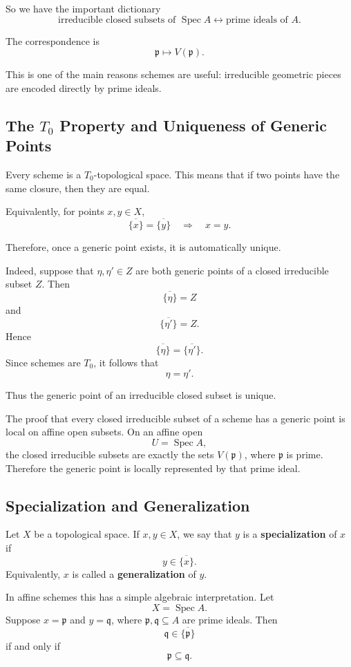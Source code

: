 \documentclass[12pt,a4paper]{article}
\DeclareMathOperator{\Spec}{Spec}
\providecommand{\Spec}{\operatorname{Spec}}
\theoremstyle{notespace}
\begin{document}
So we have the important dictionary
\[
\boxed{
	\text{irreducible closed subsets of } \Spec A
	\longleftrightarrow
	\text{prime ideals of } A.
}
\]

The correspondence is
\[
\mathfrak p\longmapsto V(\mathfrak p).
\]

This is one of the main reasons schemes are useful: irreducible geometric pieces are encoded directly by prime ideals.

\subsection{The \(T_0\) Property and Uniqueness of Generic Points}

Every scheme is a \(T_0\)-topological space. This means that if two points have the same closure, then they are equal.

Equivalently, for points \(x,y\in X\),
\[
\overline{\{x\}}=\overline{\{y\}}
\quad\Longrightarrow\quad
x=y.
\]

Therefore, once a generic point exists, it is automatically unique.

Indeed, suppose that \(\eta,\eta'\in Z\) are both generic points of a closed irreducible subset \(Z\). Then
\[
\overline{\{\eta\}}=Z
\]
and
\[
\overline{\{\eta'\}}=Z.
\]
Hence
\[
\overline{\{\eta\}}=\overline{\{\eta'\}}.
\]
Since schemes are \(T_0\), it follows that
\[
\eta=\eta'.
\]

Thus the generic point of an irreducible closed subset is unique.

The proof that every closed irreducible subset of a scheme has a generic point is local on affine open subsets. On an affine open
\[
U=\Spec A,
\]
the closed irreducible subsets are exactly the sets \(V(\mathfrak p)\), where \(\mathfrak p\) is prime. Therefore the generic point is locally represented by that prime ideal.

\subsection{Specialization and Generalization}

Let \(X\) be a topological space. If \(x,y\in X\), we say that \(y\) is a \textbf{specialization} of \(x\) if
\[
y\in \overline{\{x\}}.
\]
Equivalently, \(x\) is called a \textbf{generalization} of \(y\).

In affine schemes this has a simple algebraic interpretation. Let
\[
X=\Spec A.
\]
Suppose \(x=\mathfrak p\) and \(y=\mathfrak q\), where \(\mathfrak p,\mathfrak q\subseteq A\) are prime ideals. Then
\[
\mathfrak q\in \overline{\{\mathfrak p\}}
\]
if and only if
\[
\mathfrak p\subseteq \mathfrak q.
\]
\end{document}
